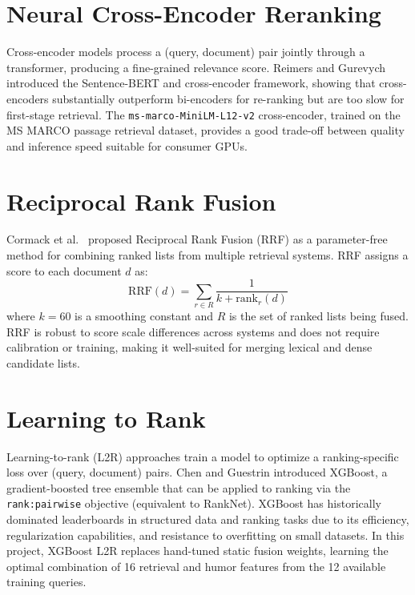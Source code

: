 \section{Neural Cross-Encoder Reranking}

Cross-encoder models process a (query, document) pair jointly through a transformer, producing a fine-grained relevance score. Reimers and Gurevych \cite{sbert} introduced the Sentence-BERT and cross-encoder framework, showing that cross-encoders substantially outperform bi-encoders for re-ranking but are too slow for first-stage retrieval. The \texttt{ms-marco-MiniLM-L12-v2} cross-encoder, trained on the MS MARCO passage retrieval dataset, provides a good trade-off between quality and inference speed suitable for consumer GPUs.

\section{Reciprocal Rank Fusion}

Cormack et al.\ \cite{rrf} proposed Reciprocal Rank Fusion (RRF) as a parameter-free method for combining ranked lists from multiple retrieval systems. RRF assigns a score to each document $d$ as:
\begin{equation}
\text{RRF}(d) = \sum_{r \in R} \frac{1}{k + \text{rank}_r(d)}
\end{equation}
where $k=60$ is a smoothing constant and $R$ is the set of ranked lists being fused. RRF is robust to score scale differences across systems and does not require calibration or training, making it well-suited for merging lexical and dense candidate lists.

\section{Learning to Rank}

Learning-to-rank (L2R) approaches train a model to optimize a ranking-specific loss over (query, document) pairs. Chen and Guestrin \cite{xgboost} introduced XGBoost, a gradient-boosted tree ensemble that can be applied to ranking via the \texttt{rank:pairwise} objective (equivalent to RankNet). XGBoost has historically dominated leaderboards in structured data and ranking tasks due to its efficiency, regularization capabilities, and resistance to overfitting on small datasets. In this project, XGBoost L2R replaces hand-tuned static fusion weights, learning the optimal combination of 16 retrieval and humor features from the 12 available training queries.

